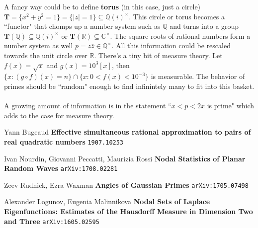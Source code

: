 \documentclass[12pt]{article}
\begin{document}
A fancy way could be to define \textbf{torus} (in this case, just a circle) $\mathbf{T} = \{ x^2 + y^2 = 1\} = \{ |z| = 1\} \subseteq \mathbb{Q}(i)^\times $.  This circle or torus becomes a ``functor" that chomps up a number system such as $\mathbb{Q}$ and turns into a group
$\mathbf{T}(\mathbb{Q}) \subseteq \mathbb{Q}(i)^\times $ or $\mathbf{T}(\mathbb{R}) \subseteq \mathbb{C}^\times$.  The square roots of rational numbers form a number system as well $p =  z \overline{z} \in \mathbb{Q}^\times$.  All this information could be rescaled towards the unit circle over $\mathbb{R}$.  There's a tiny bit of measure theory.  Let $f(x) = \sqrt{x}$ and $g(x) = 10^3[x]$, then $ \{ x : (g \circ f)(x) = n   \} \cap \{ x : 0 < f(x) < 10^{-3} \} $ is measurable.  The behavior of primes should be ``random" enough to find infinintely many to fit into this basket. \\ \\
A growing amount of information is in the statement ``$x < p < 2x $ is prime" which adds to the case for measure theory.
\vfill



\begin{thebibliography}{}

\item Yann Bugeaud {\textbf{Effective simultaneous rational approximation to pairs of real quadratic numbers}} \texttt{1907.10253}
\item Ivan Nourdin, Giovanni Peccatti, Maurizia Rossi \textbf{Nodal Statistics of Planar Random Waves} \texttt{arXiv:1708.02281}
\item Zeev Rudnick, Ezra Waxman \textbf{Angles of Gaussian Primes} \texttt{arXiv:1705.07498}
\item Alexander Logunov, Eugenia Malinnikova \textbf{Nodal Sets of Laplace Eigenfunctions: Estimates of the Hausdorff Measure in Dimension Two and Three} \texttt{arXiv:1605.02595}
\end{thebibliography} 
\end{document}
